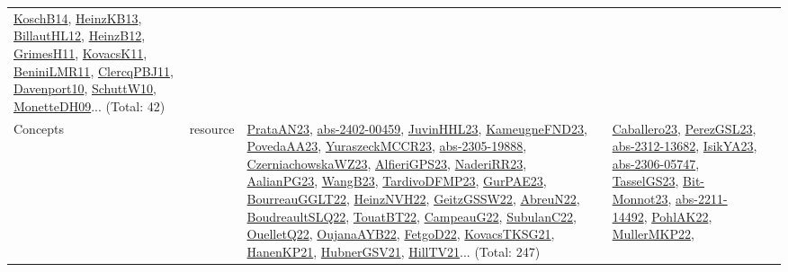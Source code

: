 {\begin{longtable}{lp{3cm}>{\raggedright}p{6cm}>{\raggedright}p{6cm}p{8cm}}
\href{papers/KoschB14.pdf}{KoschB14}\cite{KoschB14}, \href{papers/HeinzKB13.pdf}{HeinzKB13}\cite{HeinzKB13}, \href{papers/BillautHL12.pdf}{BillautHL12}\cite{BillautHL12}, \href{papers/HeinzB12.pdf}{HeinzB12}\cite{HeinzB12}, \href{papers/GrimesH11.pdf}{GrimesH11}\cite{GrimesH11}, \href{articles/KovacsK11.pdf}{KovacsK11}\cite{KovacsK11}, \href{articles/BeniniLMR11.pdf}{BeniniLMR11}\cite{BeniniLMR11}, \href{papers/ClercqPBJ11.pdf}{ClercqPBJ11}\cite{ClercqPBJ11}, \href{papers/Davenport10.pdf}{Davenport10}\cite{Davenport10}, \href{papers/SchuttW10.pdf}{SchuttW10}\cite{SchuttW10}, \href{papers/MonetteDH09.pdf}{MonetteDH09}\cite{MonetteDH09}... (Total: 42)\\
Concepts & resource & \href{articles/PrataAN23.pdf}{PrataAN23}\cite{PrataAN23}, \href{articles/abs-2402-00459.pdf}{abs-2402-00459}\cite{abs-2402-00459}, \href{papers/JuvinHHL23.pdf}{JuvinHHL23}\cite{JuvinHHL23}, \href{papers/KameugneFND23.pdf}{KameugneFND23}\cite{KameugneFND23}, \href{papers/PovedaAA23.pdf}{PovedaAA23}\cite{PovedaAA23}, \href{articles/YuraszeckMCCR23.pdf}{YuraszeckMCCR23}\cite{YuraszeckMCCR23}, \href{articles/abs-2305-19888.pdf}{abs-2305-19888}\cite{abs-2305-19888}, \href{articles/CzerniachowskaWZ23.pdf}{CzerniachowskaWZ23}\cite{CzerniachowskaWZ23}, \href{articles/AlfieriGPS23.pdf}{AlfieriGPS23}\cite{AlfieriGPS23}, \href{articles/NaderiRR23.pdf}{NaderiRR23}\cite{NaderiRR23}, \href{papers/AalianPG23.pdf}{AalianPG23}\cite{AalianPG23}, \href{papers/WangB23.pdf}{WangB23}\cite{WangB23}, \href{papers/TardivoDFMP23.pdf}{TardivoDFMP23}\cite{TardivoDFMP23}, \href{articles/GurPAE23.pdf}{GurPAE23}\cite{GurPAE23}, \href{articles/BourreauGGLT22.pdf}{BourreauGGLT22}\cite{BourreauGGLT22}, \href{articles/HeinzNVH22.pdf}{HeinzNVH22}\cite{HeinzNVH22}, \href{papers/GeitzGSSW22.pdf}{GeitzGSSW22}\cite{GeitzGSSW22}, \href{articles/AbreuN22.pdf}{AbreuN22}\cite{AbreuN22}, \href{papers/BoudreaultSLQ22.pdf}{BoudreaultSLQ22}\cite{BoudreaultSLQ22}, \href{papers/TouatBT22.pdf}{TouatBT22}\cite{TouatBT22}, \href{articles/CampeauG22.pdf}{CampeauG22}\cite{CampeauG22}, \href{articles/SubulanC22.pdf}{SubulanC22}\cite{SubulanC22}, \href{papers/OuelletQ22.pdf}{OuelletQ22}\cite{OuelletQ22}, \href{papers/OujanaAYB22.pdf}{OujanaAYB22}\cite{OujanaAYB22}, \href{articles/FetgoD22.pdf}{FetgoD22}\cite{FetgoD22}, \href{papers/KovacsTKSG21.pdf}{KovacsTKSG21}\cite{KovacsTKSG21}, \href{papers/HanenKP21.pdf}{HanenKP21}\cite{HanenKP21}, \href{articles/HubnerGSV21.pdf}{HubnerGSV21}\cite{HubnerGSV21}, \href{papers/HillTV21.pdf}{HillTV21}\cite{HillTV21}... (Total: 247) & \href{articles/Caballero23.pdf}{Caballero23}\cite{Caballero23}, \href{papers/PerezGSL23.pdf}{PerezGSL23}\cite{PerezGSL23}, \href{articles/abs-2312-13682.pdf}{abs-2312-13682}\cite{abs-2312-13682}, \href{articles/IsikYA23.pdf}{IsikYA23}\cite{IsikYA23}, \href{articles/abs-2306-05747.pdf}{abs-2306-05747}\cite{abs-2306-05747}, \href{papers/TasselGS23.pdf}{TasselGS23}\cite{TasselGS23}, \href{papers/Bit-Monnot23.pdf}{Bit-Monnot23}\cite{Bit-Monnot23}, \href{articles/abs-2211-14492.pdf}{abs-2211-14492}\cite{abs-2211-14492}, \href{articles/PohlAK22.pdf}{PohlAK22}\cite{PohlAK22}, \href{articles/MullerMKP22.pdf}{MullerMKP22}\cite{MullerMKP22}, 
\end{longtable}}
